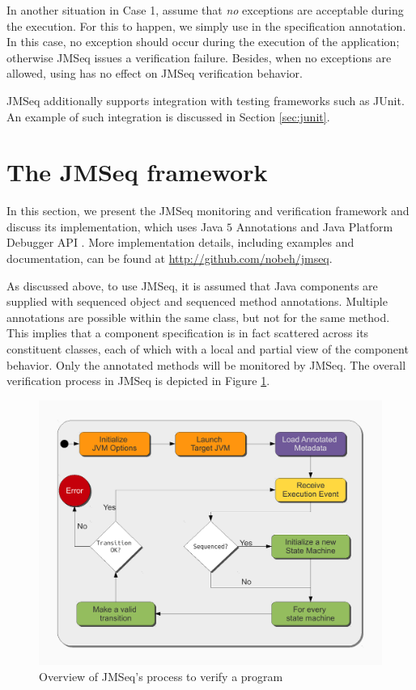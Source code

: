 In another situation in Case 1, assume that \emph{no} exceptions are
acceptable during the execution. For this to happen, we simply use
 in the specification annotation. In
this case, no exception should occur during the execution of the
application; otherwise JMSeq issues a verification failure. Besides,
when no exceptions are allowed, using  has no effect
on JMSeq verification behavior.

JMSeq additionally supports integration with testing frameworks such as JUnit. 
An example of such integration is discussed in Section \ref{sec:junit}.

\section{The JMSeq framework} \label{sec:implementation}

In this section, we present the JMSeq monitoring and verification framework and discuss its implementation, which uses Java $5$ Annotations \cite{Java_5_Annotations} and Java Platform Debugger API \cite{JPDA_Home}. 
More implementation details, including examples and documentation, can be found at \url{http://github.com/nobeh/jmseq}.

As discussed above, to use JMSeq, it is assumed that Java components are supplied with sequenced object and sequenced method annotations. 
Multiple annotations are possible within the same class, but not for the same method. 
This implies that a component specification is in fact scattered across its constituent classes, each of which with a local and partial view of the component behavior.
Only the annotated methods will be monitored by JMSeq.
The overall verification process in JMSeq is depicted in Figure \ref{fig:alg-verify}.

\begin{figure}[t]
\begin{center}
  \includegraphics[scale=0.47]{images/alg-diagram}
\end{center}
\caption{Overview of JMSeq's process to verify a program}
\label{fig:alg-verify}
\end{figure}

